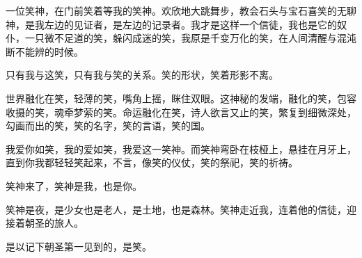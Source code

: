 \documentclass[UTF8]{article}
\begin{document}
\par 一位笑神，在门前笑着等我的笑神。欢欣地大跳舞步，教会石头与宝石喜笑的无聊神，是我左边的见证者，是左边的记录者。我才是这样一个信徒，我也是它的奴仆，一只微不足道的笑，躲闪成迷的笑，我原是千变万化的笑，在人间清醒与混沌断不能辨的时候。
\par 只有我与这笑，只有我与笑的关系。笑的形状，笑着形影不离。
\par 世界融化在笑，轻薄的笑，嘴角上摇，眯住双眼。这神秘的发端，融化的笑，包容收摄的笑，魂牵梦萦的笑。命运融化在笑，诗人欲言又止的笑，繁复到细微深处，勾画而出的笑，笑的名字，笑的言语，笑的国。
\par 我爱你如笑，我的爱如笑，我爱这一笑神。而笑神弯卧在枝桠上，悬挂在月牙上，直到你我都轻轻笑起来，不言，像笑的仪仗，笑的祭祀，笑的祈祷。
\par 笑神来了，笑神是我，也是你。
\par 笑神是夜，是少女也是老人，是土地，也是森林。笑神走近我，连着他的信徒，迎接着朝圣的旅人。
\par 是以记下朝圣第一见到的，是笑。
\end{document}
